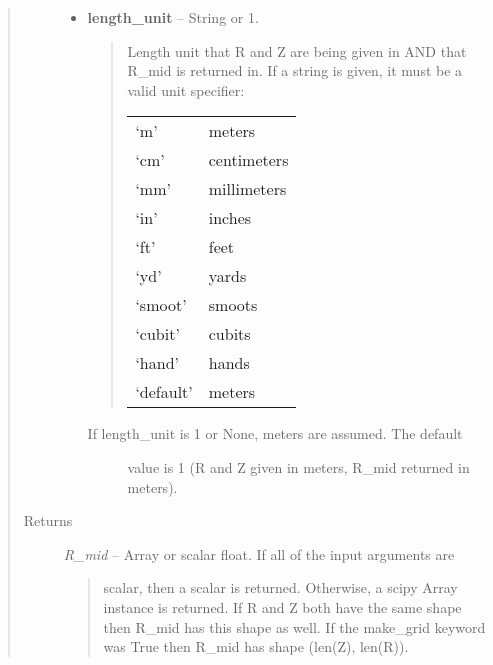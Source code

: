 \documentclass[letterpaper,10pt,english]{sphinxmanual}
\begin{document}
\begin{fulllineitems}
\begin{fulllineitems}
\begin{quote}
\begin{description}
\begin{itemize}
\item {} 
\textbf{length\_unit} --
String or 1.
\begin{quote}

Length unit that R and Z are being given
in AND that R\_mid is returned in. If a string is given, it
must be a valid unit specifier:

\begin{tabulary}{\linewidth}{|L|L|}
\hline

`m'
 & 
meters
\\

`cm'
 & 
centimeters
\\

`mm'
 & 
millimeters
\\

`in'
 & 
inches
\\

`ft'
 & 
feet
\\

`yd'
 & 
yards
\\

`smoot'
 & 
smoots
\\

`cubit'
 & 
cubits
\\

`hand'
 & 
hands
\\

`default'
 & 
meters
\\
\hline\end{tabulary}

\end{quote}
\begin{description}
\item[{If length\_unit is 1 or None, meters are assumed. The default}] \leavevmode
value is 1 (R and Z given in meters, R\_mid returned in meters).

\end{description}

\end{itemize}

\item[{Returns}] \leavevmode

\emph{R\_mid} --
Array or scalar float. If all of the input arguments are
\begin{quote}

scalar, then a scalar is returned. Otherwise, a scipy Array
instance is returned. If R and Z both have the same shape then
R\_mid has this shape as well. If the make\_grid keyword was True
then R\_mid has shape (len(Z), len(R)).
\end{quote}



\end{description}
\end{quote}
\end{fulllineitems}
\end{fulllineitems}
\end{document}
